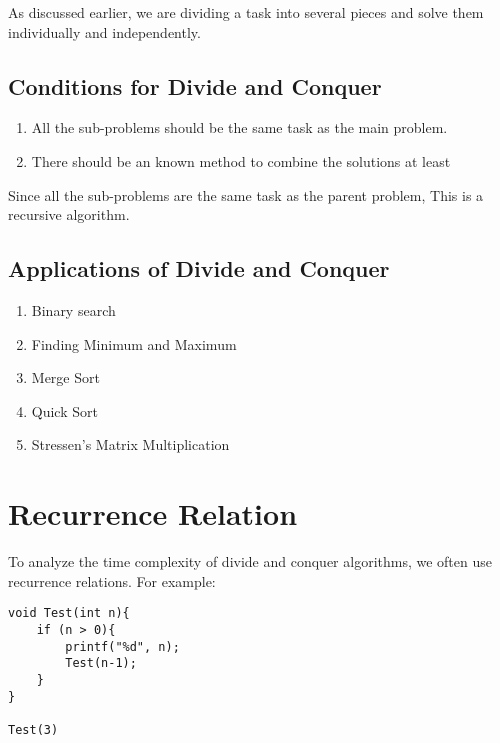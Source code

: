 \documentclass[]{article}
\begin{document}
As discussed earlier, we are dividing a task into several pieces and solve them individually and independently. 

\subsection{Conditions for Divide and Conquer}
\begin{enumerate}
    \item All the sub-problems should be the same task as the main problem.
    \item There should be an known method to combine the solutions at least
\end{enumerate}

Since all the sub-problems are the same task as the parent problem, This is a recursive algorithm. 

\subsection{Applications of Divide and Conquer}
\begin{enumerate}
    \item Binary search
    \item Finding Minimum and Maximum
    \item Merge Sort
    \item Quick Sort
    \item Stressen's Matrix Multiplication
\end{enumerate}

\section{Recurrence Relation}
To analyze the time complexity of divide and conquer algorithms, we often use recurrence relations. For example:

\begin{verbatim}
void Test(int n){
    if (n > 0){
        printf("%d", n);
        Test(n-1);
    }
}

Test(3)
\end{verbatim}


\begin{center}
\end{center}
\end{document}
